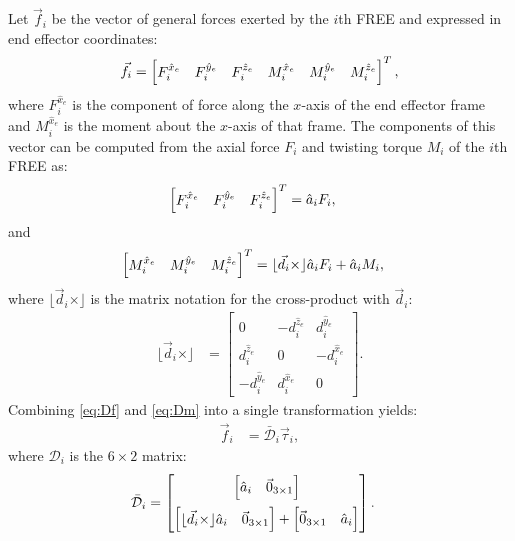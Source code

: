 Let $\vec{f}_i$ be the vector of general forces exerted by the $i$th FREE and expressed in end effector coordinates:
\begin{align}
    \vec{f}_i = \begin{bmatrix} F^{\hat{x}_e}_i & F^{\hat{y}_e}_i & F^{\hat{z}_e}_i & M^{\hat{x}_e}_i & M^{\hat{y}_e}_i & M^{\hat{z}_e}_i \end{bmatrix}^T,
\end{align}
where $F^{\hat{x}_e}_i$ is the component of force along the $x$-axis of the end effector frame and $M^{\hat{x}_e}_i$ is the moment about the $x$-axis of that frame.
The components of this vector can be computed from the axial force $F_i$ and twisting torque $M_i$ of the $i$th FREE as:
\begin{align}
    \begin{bmatrix} F^{\hat{x}_e}_i & F^{\hat{y}_e}_i & F^{\hat{z}_e}_i \end{bmatrix}^T &= \hat{a}_i F_i ,   \label{eq:Df}
\end{align}
and
\begin{align}
    \begin{bmatrix} M^{\hat{x}_e}_i & M^{\hat{y}_e}_i & M^{\hat{z}_e}_i \end{bmatrix}^T &= \lfloor \vec{d}_i \times \rfloor \hat{a}_i F_i + \hat{a}_i M_i,    \label{eq:Dm}
\end{align}
where $\lfloor \vec{d}_i \times \rfloor$ is the matrix notation for the cross-product with $\vec{d}_i$:
\begin{align}
    \lfloor \vec{d}_i \times \rfloor &= \begin{bmatrix} 0 & -d_i^{\hat{z}_e} & d_i^{\hat{y}_e} \\ d_i^{\hat{z}_e} & 0 & -d_i^{\hat{x}_e} \\ -d_i^{\hat{y}_e} & d_i^{\hat{x}_e} & 0 \end{bmatrix}. 
\end{align}
Combining \eqref{eq:Df} and \eqref{eq:Dm} into a single transformation yields:
\begin{align}
    \vec{f}_i &= \bar{\mathcal{D}}_i \vec{\tau}_i,  \label{eq:zetai}
\end{align}
where $\mathcal{D}_{i}$ is the $6 \times 2$ matrix:
\begin{align}
    \bar{\mathcal{D}}_i &= \begin{bmatrix}
                    \begin{bmatrix} \hat{a}_i & \vec{0}_{3\times1} \end{bmatrix} \vspace{5pt} \\ 
                    \begin{bmatrix} \lfloor \vec{d}_i \times \rfloor \hat{a}_i & \vec{0}_{3\times1} \end{bmatrix} + \begin{bmatrix} \vec{0}_{3\times1} & \hat{a}_i \end{bmatrix}
                    \end{bmatrix}.   \label{eq:D}
\end{align}


